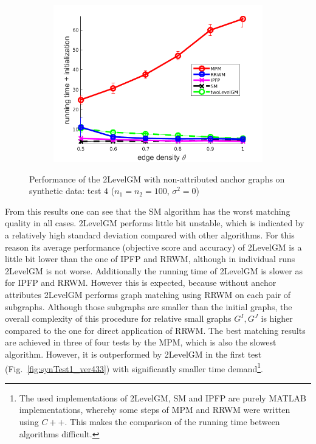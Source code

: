 \begin{figure}
\begin{subfigure}[b]{0.33\textwidth}
			\includegraphics[scale=0.25]{"chapter3/fig/SyntheticTest/no_descr/Results_v4.3.3/Test4/time_summary_avg10t"} 
		\end{subfigure} 	
	\caption[Performance of the 2LevelGM with non-attributed anchor graphs on synthetic data (test $4$)]{Performance of the 2LevelGM with non-attributed anchor graphs on synthetic data: test $4$ ($n_1=n_2=100$, $\sigma^2=0$)}
	\label{fig:synTest4_ver433}
\end{figure}

From this results one can see that the SM algorithm has the worst matching quality in all cases. 2LevelGM performs little bit unstable, which is indicated by a relatively high standard deviation compared with other algorithms. For this reason its average performance (objective score and accuracy) of 2LevelGM is a little bit lower than the one of IPFP and RRWM, although in individual runs 2LevelGM is not worse. Additionally the running time of 2LevelGM is slower as for IPFP and RRWM. However this is expected, because without anchor attributes 2LevelGM performs graph matching using RRWM on each pair of subgraphs. Although those subgraphs are smaller than the initial graphs, the overall complexity of this procedure for relative small graphs $G^I,G^J$ is higher compared to the one for direct application of RRWM. The best matching results are achieved in three of four tests by the MPM, which is also the slowest algorithm. However, it is outperformed by 2LevelGM in the first test (Fig.~\ref{fig:synTest1_ver433}) with significantly smaller time demand\footnote{The used implementations of 2LevelGM, SM and IPFP are purely MATLAB implementations, whereby some steps of MPM and RRWM were written using $C++$. This makes the comparison of the running time between algorithms difficult.}.


